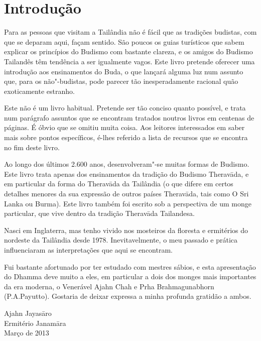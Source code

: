 \clearpage
\chapter{Introdução}

Para as pessoas que visitam a Tailândia não é fácil que as tradições
budistas, com que se deparam aqui, façam sentido. São poucos os guias
turísticos que sabem explicar os princípios do Budismo com bastante
clareza, e os amigos do Budismo Tailandês têm tendência a ser igualmente
vagos. Este livro pretende oferecer uma introdução aos ensinamentos do
Buda, o que lançará alguma luz num assunto que, para os não"-budistas,
pode parecer tão inesperadamente racional quão exoticamente estranho.

Este não é um livro habitual. Pretende ser tão conciso quanto possível,
e trata num parágrafo assuntos que se encontram tratados noutros livros
em centenas de páginas. É óbvio que se omitiu muita coisa. Aos leitores
interessados em saber mais sobre pontos específicos, é-lhes referido a
lista de recursos que se encontra no fim deste livro.

Ao longo dos últimos 2.600 anos, desenvolveram"-se muitas formas de
Budismo. Este livro trata apenas dos ensinamentos da tradição do Budismo
Theravāda, e em particular da forma do Theravāda da Tailândia (o que
difere em certos detalhes menores da sua expressão de outros países
Theravāda, tais como O Sri Lanka ou Burma). Este livro também foi
escrito sob a perspectiva de um monge particular, que vive dentro da
tradição Theravāda Tailandesa.

Nasci em Inglaterra, mas tenho vivido nos mosteiros da floresta e
ermitérios do nordeste da Tailândia desde 1978. Inevitavelmente, o meu
passado e prática influenciaram as interpretações que aqui se encontram.

\clearpage

Fui bastante afortunado por ter estudado com mestres sábios, e esta
apresentação do Dhamma deve muito a eles, em particular a dois dos
monges mais importantes da era moderna, o Venerável Ajahn Chah e Prha
Brahmagunabhorn (P.A.Payutto). Gostaria de deixar expressa a minha
profunda gratidão a ambos.

\bigskip

{\raggedleft
  Ajahn Jayasāro\\
  Ermitério Janamāra\\
  Março de 2013
\par}
